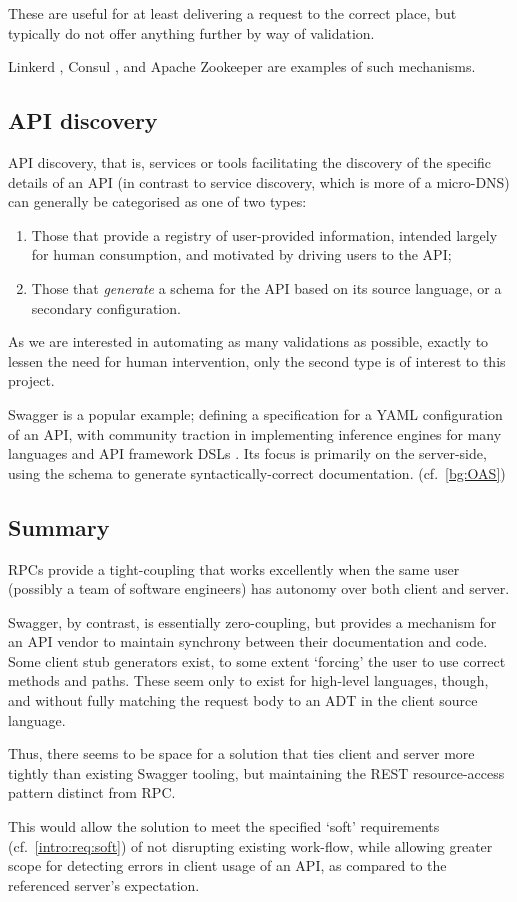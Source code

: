 These are useful for at least delivering a request to the correct place, but typically do not offer anything further by way of validation.

Linkerd \cite{service_discovery_linkerd}, Consul \cite{service_discovery_consul}, and Apache Zookeeper \cite{service_discovery_apache} are examples of such mechanisms.

\subsection{API discovery}\label{soln:api-discovery}
API discovery, that is, services or tools facilitating the discovery of the specific details of an API (in contrast to service discovery, which is more of a micro-DNS) can generally be categorised as one of two types:

\begin{enumerate}
\item Those that provide a registry of user-provided information, intended largely for human consumption, and motivated by driving users to the API;
\item Those that \emph{generate} a schema for the API based on its source language, or a secondary configuration.
\end{enumerate}

As we are interested in automating as many validations as possible, exactly to lessen the need for human intervention, only the second type is of interest to this project.

Swagger \cite{swagger} is a popular example; defining a specification for a YAML \cite{yaml} configuration of an API, with community traction in implementing inference engines for many languages and API framework DSLs \cite{swagger_oss}. Its focus is primarily on the server-side, using the schema to generate syntactically-correct documentation. (cf.~\ref{bg:OAS})

\subsection{Summary}\label{soln:summary}
RPCs provide a tight-coupling that works excellently when the same user (possibly a team of software engineers) has autonomy over both client and server.

Swagger, by contrast, is essentially zero-coupling, but provides a mechanism for an API vendor to maintain synchrony between their documentation and code. Some client stub generators exist, to some extent `forcing' the user to use correct methods and paths. These seem only to exist for high-level languages, though, and without fully matching the request body to an ADT in the client source language. \cite{swagger_oss}

Thus, there seems to be space for a solution that ties client and server more tightly than existing Swagger tooling, but maintaining the REST resource-access pattern distinct from RPC.

This would allow the solution to meet the specified `soft' requirements (cf.~\ref{intro:req:soft}) of not disrupting existing work-flow, while allowing greater scope for detecting errors in client usage of an API, as compared to the referenced server's expectation.
